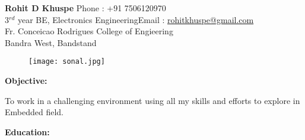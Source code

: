 \documentclass[a4paper]{article}
\begin{document}
	\begin{flushleft}
		\large\textbf{Rohit D Khuspe} \hfill{Phone : +91 7506120970}\\
		3$^{rd}$ year BE, Electronics Engineering\hfill{Email : \underline{rohitkhuspe@gmail.com}}\\
		Fr. Conceicao Rodrigues College of Engieering\\
		Bandra West, Bandstand
		
	\end{flushleft}
	\begin{figure}[h]
		\begin{flushright}
			\vspace{-0.5in}
			\texttt{[image: sonal.jpg]}
		\end{flushright}
	\end{figure}
	\hline

    \begin{flushleft}
    \begin{Large}\textbf{Objective:}\end{Large} \hspace{0.05in}To work in a challenging environment using all my skills and efforts to explore in\\\hspace{1.075in} Embedded field.\\
     \begin{Large}\textbf{Education:}\end{Large}
   
    \end{flushleft}
    
	
\end{document}
